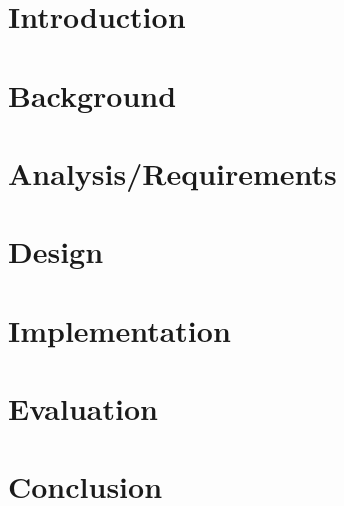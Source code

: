 \documentclass{l4proj}
\begin{document}
\chapter{Introduction}


\chapter{Background}

\chapter{Analysis/Requirements}

\chapter{Design}

\chapter{Implementation}

\chapter{Evaluation} 

\chapter{Conclusion}    

%
% 
\end{document}
